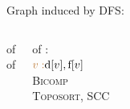 
\begin{frame}{} 
  \centerline{\large Graph  induced by DFS:}

  \vspace{0.50cm}
  \begin{columns}
      \begin{center}
	 of  \\[15pt]

	 of 
      \end{center}
    \pause
      \begin{center}
	 of : \\[15pt]

	$\textcolor{brown}{v:} \text{d}[v], \text{f}[v]$ \\[10pt]

	 \textsc{Bicomp} \\[10pt]

	 \textsc{Toposort}, \textsc{SCC}
      \end{center}
  \end{columns}
\end{frame}


